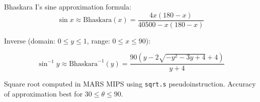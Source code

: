 Bhaskara I's sine approximation formula:
$$ \sin x \approx \text{Bhaskara}(x) = 
\frac{4 x \left( 180 - x  \right)}
{40500 - x \left( 180 - x \right)}$$

\noindent Inverse (domain: $0 \leq y \leq 1$, range: $0 \leq x \leq 90$):

$$\sin^{-1}y \approx
\text{Bhaskara}^{-1}(y) = \frac
{90 \left(y - 2\sqrt{-y^2 - 3y + 4} +4 \right)}{y+4}$$

\noindent Square root computed in MARS MIPS using \texttt{sqrt.s} pseudoinstruction. 
Accuracy of approximation best
for $30 \leq \theta \leq 90$.